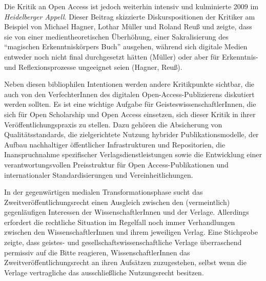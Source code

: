 \documentclass[a4paper,
fontsize=11pt,
oneside,
numbers=noperiodatend,
parskip=half-,
bibliography=totoc,
final
]{scrartcl}
\begin{document}
Die Kritik an Open Access ist jedoch weiterhin intensiv und kulminierte
2009 im \emph{Heidelberger Appell}. Dieser Beitrag skizzierte
Diskurspositionen der Kritiker am Beispiel von Michael Hagner, Lothar
Müller und Roland Reuß und zeigte, dass sie von einer
medientheoretischen Überhöhung, einer Sakralisierung des
\enquote{magischen Erkenntniskörpers Buch} ausgehen, während sich
digitale Medien entweder noch nicht final durchgesetzt hätten (Müller)
oder aber für Erkenntnis- und Reflexionsprozesse ungeeignet seien
(Hagner, Reuß).

Neben diesen bibliophilen Intentionen werden andere Kritikpunkte
sichtbar, die auch von den VerfechterInnen des digitalen
Open-Access-Publizierens diskutiert werden sollten. Es ist eine wichtige
Aufgabe für GeisteswissenschaftlerInnen, die sich für Open Scholarship
und Open Access einsetzen, sich dieser Kritik in ihrer
Veröffentlichungspraxis zu stellen. Dazu gehören die Absicherung von
Qualitätsstandards, die zielgerichtete Nutzung hybrider
Publikationsmodelle, der Aufbau nachhaltiger öffentlicher
Infrastrukturen und Repositorien, die Inanspruchnahme spezifischer
Verlagsdienstleistungen sowie die Entwicklung einer verantwortungsvollen
Preisstruktur für Open Access-Publikationen und internationaler
Standardisierungen und Vereinheitlichungen.

In der gegenwärtigen medialen Transformationsphase sucht das
Zweitveröffentlichungsrecht einen Ausgleich zwischen den (vermeintlich)
gegenläufigen Interessen der WissenschaftlerInnen und der Verlage.
Allerdings erfordert die rechtliche Situation im Regelfall noch immer
Verhandlungen zwischen den WissenschaftlerInnen und ihrem jeweiligen
Verlag. Eine Stichprobe zeigte, dass geistes- und
gesellschaftswissenschaftliche Verlage überraschend permissiv auf die
Bitte reagieren, WissenschaftlerInnen das Zweitveröffentlichungsrecht an
ihren Aufsätzen zuzugestehen, selbst wenn die Verlage vertragliche das
ausschließliche Nutzungsrecht besitzen.
\end{document}
